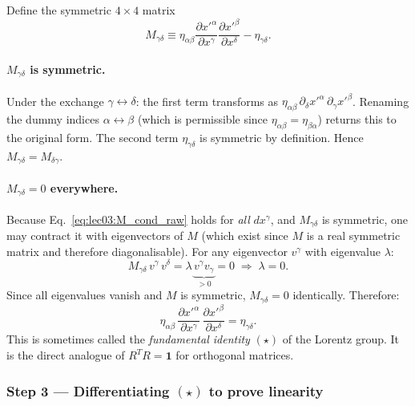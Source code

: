 Define the symmetric $4\times 4$ matrix
\begin{equation}
  M_{\gamma\delta} \equiv
    \eta_{\alpha\beta}
    \frac{\partial x'^\alpha}{\partial x^\gamma}
    \frac{\partial x'^\beta}{\partial x^\delta}
    - \eta_{\gamma\delta}.
  \label{eq:lec03:M_def}
\end{equation}

\paragraph{$M_{\gamma\delta}$ is symmetric.}
Under the exchange $\gamma\leftrightarrow\delta$:
the first term transforms as
$\eta_{\alpha\beta}\,\partial_\delta x'^\alpha\,\partial_\gamma x'^\beta$.
Renaming the dummy indices $\alpha\leftrightarrow\beta$ (which is
permissible since $\eta_{\alpha\beta}=\eta_{\beta\alpha}$) returns this
to the original form.  The second term $\eta_{\gamma\delta}$ is
symmetric by definition.  Hence $M_{\gamma\delta} = M_{\delta\gamma}$.

\paragraph{$M_{\gamma\delta} = 0$ everywhere.}
Because Eq.~\eqref{eq:lec03:M_cond_raw} holds for \emph{all}
$dx^\gamma$, and $M_{\gamma\delta}$ is symmetric, one may contract it
with eigenvectors of $M$ (which exist since $M$ is a real symmetric
matrix and therefore diagonalisable).  For any eigenvector $v^\gamma$
with eigenvalue $\lambda$:
\begin{equation*}
  M_{\gamma\delta}\,v^\gamma\,v^\delta
  = \lambda\,\underbrace{v^\gamma v_\gamma}_{>0} = 0
  \;\Rightarrow\; \lambda = 0.
\end{equation*}
Since all eigenvalues vanish and $M$ is symmetric, $M_{\gamma\delta}=0$
identically. Therefore:
\begin{equation}
  \boxed{
  \eta_{\alpha\beta}\,
  \frac{\partial x'^\alpha}{\partial x^\gamma}\,
  \frac{\partial x'^\beta}{\partial x^\delta}
  = \eta_{\gamma\delta}.}
  \label{eq:lec03:star}
\end{equation}
This is sometimes called the \emph{fundamental identity} $(\star)$ of
the Lorentz group.  It is the direct analogue of $R^T R = \mathbf{1}$
for orthogonal matrices.

\subsubsection*{Step 3 — Differentiating $(\star)$ to prove linearity}

